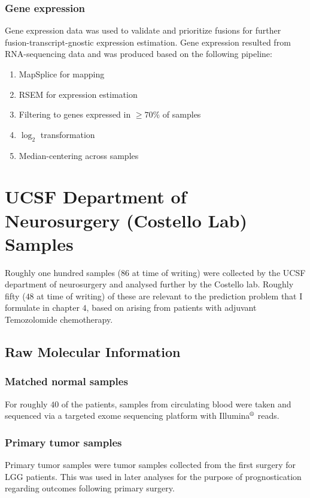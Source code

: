 \subsubsection{Gene expression}

Gene expression data was used to validate and prioritize fusions for
further fusion-transcript-gnostic expression estimation. Gene
expression resulted from RNA-sequencing data and was produced based on
the following pipeline:

\begin{enumerate}
\item MapSplice for mapping \cite{wang_mapsplice:_2010}
  
\item RSEM\cite{li_rsem:_2011} for expression estimation
  
\item Filtering to genes expressed in $\geq 70\%$ of samples
  
\item $\log_2$ transformation  
\item Median-centering across samples
\end{enumerate}

\section{UCSF Department of Neurosurgery (Costello Lab) Samples}

Roughly one hundred samples ($86$ at time of writing) were collected by the UCSF department of
neurosurgery and analysed further by the Costello lab. Roughly fifty
($48$ at time of writing) of these are relevant to the prediction problem that I formulate in
chapter $4$, based on arising from patients with adjuvant Temozolomide
chemotherapy. 

\subsection{Raw Molecular Information}
\subsubsection{Matched normal samples} \label{matched_normal}
For roughly $40$ of the patients, samples from circulating blood were
taken and sequenced via a targeted exome sequencing platform with
Illumina$\reg$ reads.

\subsubsection{Primary tumor samples}
Primary tumor samples were tumor samples collected from the first
surgery for LGG patients. This was used in later analyses for the
purpose of prognostication regarding outcomes following primary
surgery. 

